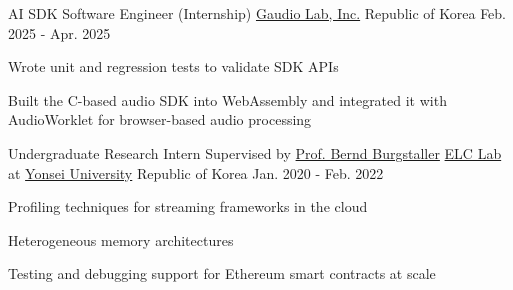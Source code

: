 

\begin{cventries}

  \cventry
    {AI SDK Software Engineer (Internship)} %
    {\href{https://www.gaudiolab.com}{Gaudio Lab, Inc.}} %
    {Republic of Korea} %
    {Feb. 2025 - Apr. 2025} %
    {
      \begin{cvitems} %
        \item {Wrote unit and regression tests to validate SDK APIs}
        \item {Built the C-based audio SDK into WebAssembly and integrated it with AudioWorklet for browser-based audio processing}
      \end{cvitems}
    }


  \cventry
    {Undergraduate Research Intern Supervised by \href{https://cs.yonsei.ac.kr/csai/member/fullProfessor.do}{Prof. Bernd Burgstaller}} %
    {\href{https://elc.yonsei.ac.kr}{ELC Lab} at \href{https://www.yonsei.ac.kr/sc/index.jsp}{Yonsei University}} %
    {Republic of Korea} %
    {Jan. 2020 - Feb. 2022} %
    {
      \begin{cvitems} %
        \item {Profiling techniques for streaming frameworks in the cloud}
        \item {Heterogeneous memory architectures}
        \item {Testing and debugging support for Ethereum smart contracts at scale}
      \end{cvitems}
    }

\end{cventries}

